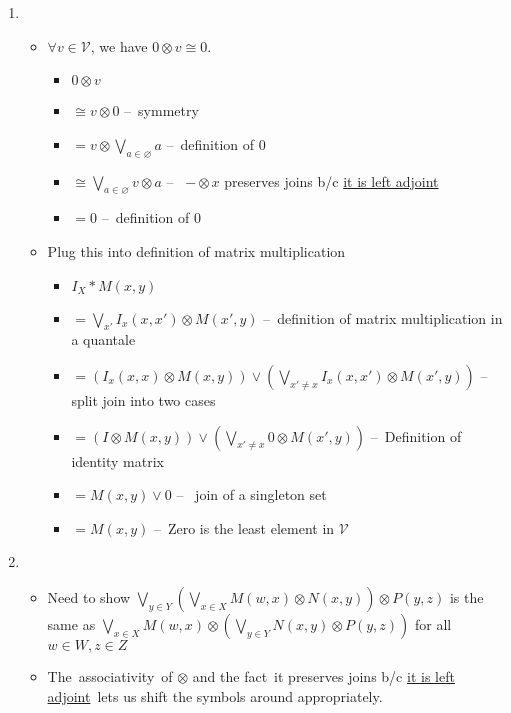 \begin{enumerate}
    \item
          \begin{itemize}
            \item $\forall v \in \mathcal{V}$, we have $0 \otimes v \cong 0$.
              \begin{itemize}
              \item $0 \otimes v$
              \item $\cong v \otimes 0$ -- \,symmetry\,
              \item $= v \otimes \bigvee_{a \in \varnothing} a$ -- \,definition of $0$\,
              \item $\cong \bigvee_{a \in \varnothing} v \otimes a$ -- \, $-\otimes x$ preserves joins b/c \hyperref[P2.87]{it is left adjoint}\,
              \item $= 0$ -- \,definition of 0\,
            \end{itemize}
          \item Plug this into definition of matrix multiplication
          \begin{itemize}
            \item $I_X * M(x,y)$
            \item $= \bigvee_{x'}I_x(x,x')\otimes M(x',y)$ -- \,definition of matrix multiplication in a quantale\,
            \item $=(I_x(x,x)\otimes M(x,y))\vee(\bigvee_{x'\ne x}I_x(x,x')\otimes M(x',y))$ -- \,split join into two cases\,
            \item $=(I\otimes M(x,y))\vee(\bigvee_{x'\ne x}0\otimes M(x',y))$ -- \,Definition of identity matrix\,
            \item $=M(x,y)\vee 0$ -- \, join of a singleton set\,
            \item $=M(x,y)$ -- \,Zero is the least element in $\mathcal{V}$\,
          \end{itemize}
        \end{itemize}
        \item \begin{itemize}
            \item Need to show $\underset{y \in Y}\bigvee (\underset{x\in X}\bigvee M(w,x)\otimes N(x,y))\otimes P(y,z)$ is the same as $\underset{x \in X}\bigvee M(w,x)\otimes(\underset{y \in Y}\bigvee N(x,y) \otimes P(y,z))$ for all $w \in W,z \in Z$
            \item The \,associativity\, of $\otimes$ and the fact \,it preserves joins b/c \hyperref[P2.87]{it is left adjoint}\, lets us shift the symbols around appropriately.

       \end{itemize}
  \end{enumerate}
